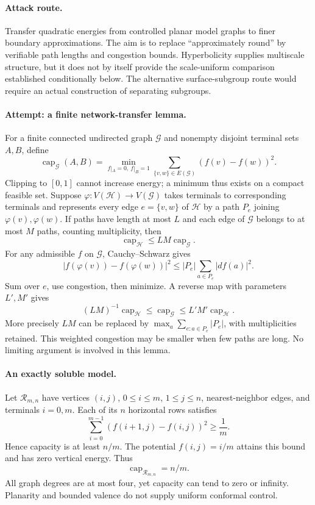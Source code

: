 \documentclass[11pt,a4paper]{article}
\numberwithin{equation}{section}
\begin{document}
\paragraph{Attack route.}
Transfer quadratic energies from controlled planar model graphs to finer
boundary approximations. The aim is to replace ``approximately round'' by
verifiable path lengths and congestion bounds. Hyperbolicity supplies
multiscale structure, but it does not by itself provide the scale-uniform
comparison established conditionally below. The alternative surface-subgroup
route would require an actual construction of separating subgroups.

\paragraph{Attempt: a finite network-transfer lemma.}
For a finite connected undirected graph $\mathcal G$ and nonempty disjoint
terminal sets $A,B$, define
\[
 \operatorname{cap}_{\mathcal G}(A,B)
 =\min_{f|_A=0,\ f|_B=1}\sum_{\{v,w\}\in E(\mathcal G)}(f(v)-f(w))^2.
\]
Clipping to $[0,1]$ cannot increase energy; a minimum thus exists on a compact
feasible set. Suppose $\varphi:V(\mathcal H)\to V(\mathcal G)$ takes
terminals to corresponding terminals and represents every edge
$e=\{v,w\}$ of $\mathcal H$ by a path $P_e$ joining $\varphi(v),\varphi(w)$.
If paths have length at most $L$ and each edge of $\mathcal G$ belongs to at
most $M$ paths, counting multiplicity, then
\begin{equation}\label{30000030:transfer}
 \operatorname{cap}_{\mathcal H}\le LM\operatorname{cap}_{\mathcal G}.
\end{equation}
For any admissible $f$ on $\mathcal G$, Cauchy--Schwarz gives
\[
 |f(\varphi(v))-f(\varphi(w))|^2
 \le |P_e|\sum_{a\in P_e}|df(a)|^2.
\]
Sum over $e$, use congestion, then minimize. A reverse map with parameters
$L',M'$ gives
\[
 (LM)^{-1}\operatorname{cap}_{\mathcal H}
 \le\operatorname{cap}_{\mathcal G}
 \le L'M'\operatorname{cap}_{\mathcal H}.
\]
More precisely $LM$ can be replaced by
$\max_a\sum_{e:a\in P_e}|P_e|$, with multiplicities retained. This weighted
congestion may be smaller when few paths are long. No limiting argument is
involved in this lemma.

\paragraph{An exactly soluble model.}
Let $\mathcal R_{m,n}$ have vertices $(i,j)$, $0\le i\le m$, $1\le j\le n$,
nearest-neighbor edges, and terminals $i=0,m$. Each of its $n$ horizontal
rows satisfies
\[
 \sum_{i=0}^{m-1}(f(i+1,j)-f(i,j))^2\ge\frac1m.
\]
Hence capacity is at least $n/m$. The potential $f(i,j)=i/m$ attains this
bound and has zero vertical energy. Thus
\begin{equation}\label{30000030:grid}
 \operatorname{cap}_{\mathcal R_{m,n}}=n/m.
\end{equation}
All graph degrees are at most four, yet capacity can tend to zero or
infinity. Planarity and bounded valence do not supply uniform conformal
control.
\end{document}
